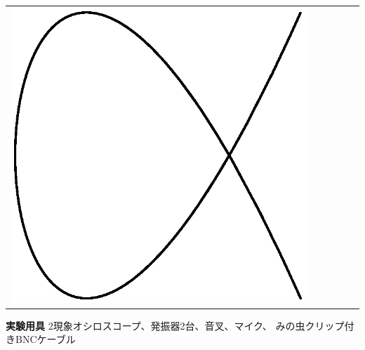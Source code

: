 \begin{center}
\begin{tabular}{c|ccccc}
\includegraphics[scale=0.2]{05_Oscilloscope/4-5.eps} \\
\end{tabular}
\end{center}

\newpage

\jikken

\begin{itemsquarebox}[c]{\bf 実験用具}
2現象オシロスコープ、発振器2台、音叉、マイク、 
みの虫クリップ付きBNCケーブル 
\end{itemsquarebox}

\bigskip


